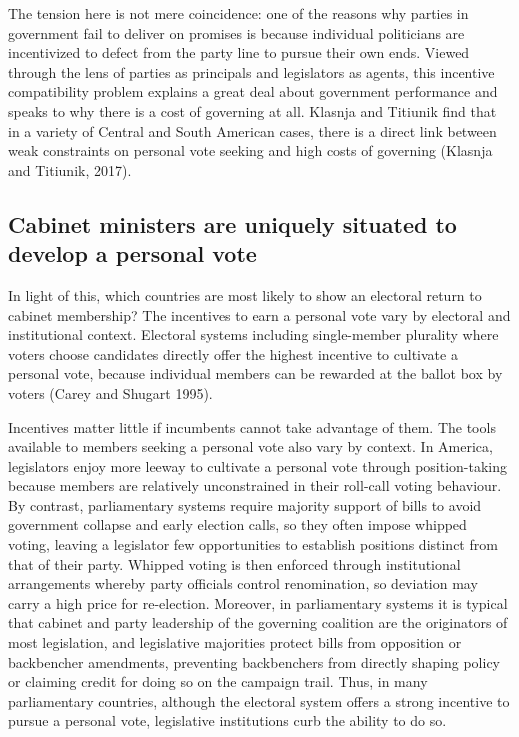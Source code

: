 \documentclass[letter,12pt]{article}
\begin{document}
The tension here is not mere coincidence: one of the reasons why parties in government fail to deliver on promises is because individual politicians are incentivized to defect from the party line to pursue their own ends. Viewed through the lens of parties as principals and legislators as agents, this incentive compatibility problem explains a great deal about government performance and speaks to why there is a cost of governing at all. Klasnja and Titiunik find that in a variety of Central and South American cases, there is a direct link between weak constraints on personal vote seeking and high costs of governing (Klasnja and Titiunik, 2017).

\subsection*{Cabinet ministers are uniquely situated to develop a personal vote}

In light of this, which countries are most likely to show an electoral return to cabinet membership? The incentives to earn a personal vote vary by electoral and institutional context. Electoral systems including single-member plurality where voters choose candidates directly offer the highest incentive to cultivate a personal vote, because individual members can be rewarded at the ballot box by voters (Carey and Shugart 1995).

Incentives matter little if incumbents cannot take advantage of them. The tools available to members seeking a personal vote also vary by context. In America, legislators enjoy more leeway to cultivate a personal vote through position-taking because members are relatively unconstrained in their roll-call voting behaviour.  By contrast, parliamentary systems require majority support of bills to avoid government collapse and early election calls, so they often impose whipped voting, leaving a legislator few opportunities to establish positions distinct from that of their party. Whipped voting is then enforced through institutional arrangements whereby party officials control renomination, so deviation may carry a high price for re-election. Moreover, in parliamentary systems it is typical that cabinet and party leadership of the governing coalition are the originators of most legislation, and legislative majorities protect bills from opposition or backbencher amendments, preventing backbenchers from directly shaping policy or claiming credit for doing so on the campaign trail. Thus, in many parliamentary countries, although the electoral system offers a strong incentive to pursue a personal vote, legislative institutions curb the ability to do so.
\end{document}
